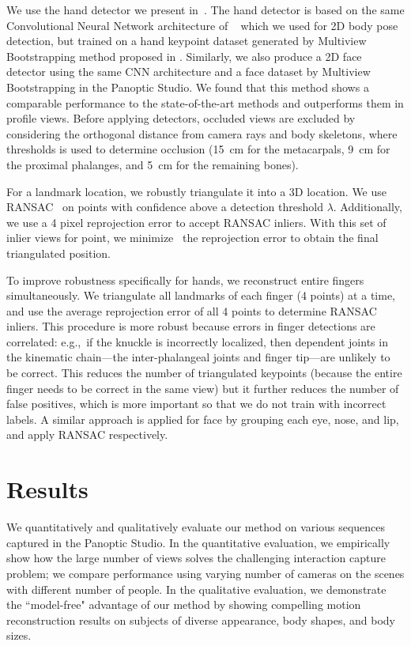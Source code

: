 We use the hand detector we present in~\cite{Tomas-17}. The hand detector is based on the same Convolutional Neural Network architecture of ~\cite{Wei-2016} which we used for 2D body pose detection, but trained on a hand keypoint dataset generated by Multiview Bootstrapping method proposed in \cite{Tomas-17}. Similarly, we also produce a 2D face detector using the same CNN architecture and a face dataset by Multiview Bootstrapping in the Panoptic Studio. We found that this method shows a comparable performance to the state-of-the-art methods and outperforms them in profile views.  Before applying detectors, occluded views are excluded by considering the orthogonal distance from camera rays and body skeletons, where thresholds is used to determine occlusion (15~cm for the metacarpals, 9~cm for the proximal phalanges, and 5~cm for the remaining bones). 


For a landmark location, we robustly triangulate it into a 3D location. We use RANSAC~\cite{Fischler-81} on points with confidence above a detection threshold $\lambda$. Additionally, we use a 4 pixel reprojection error to accept RANSAC inliers. With this set of inlier views for point, we minimize~\cite{ceres-solver} the reprojection error to obtain the final triangulated position. 

To improve robustness specifically for hands, we reconstruct entire fingers simultaneously. We triangulate all landmarks of each finger (4 points) at a time, and use the average reprojection error of all 4 points to determine RANSAC inliers. This procedure is more robust because errors in finger detections are correlated: e.g.,~if the knuckle is incorrectly localized, then dependent joints in the kinematic chain---the inter-phalangeal joints and finger tip---are unlikely to be correct. This reduces the number of triangulated keypoints (because the entire finger needs to be correct in the same view) but it further reduces the number of false positives, which is more important so that we do not train with incorrect labels. A similar approach is applied for face by grouping each eye, nose, and lip, and apply RANSAC respectively. 

\section{Results}

We quantitatively and qualitatively evaluate our method on various sequences captured in the Panoptic Studio. In the quantitative evaluation, we empirically show how the large number of views solves the challenging interaction capture problem; we compare performance using varying number of cameras on the scenes with different number of people. In the qualitative evaluation, we demonstrate the ``model-free" advantage of our method by showing compelling motion reconstruction results on subjects of diverse appearance, body shapes, and body sizes.

